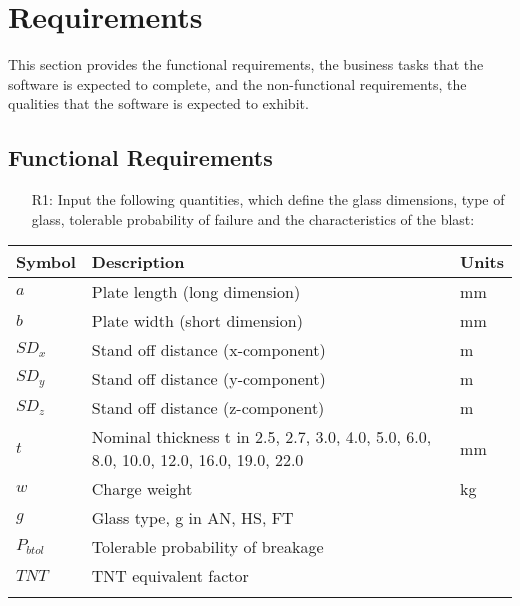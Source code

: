 \documentclass[12pt]{article}
\begin{document}
\section{Requirements}
\label{Sec:Requ}
This section provides the functional requirements, the business tasks that the software is expected to complete, and the non-functional requirements, the qualities that the software is expected to exhibit.
\subsection{Functional Requirements}
\label{Sec:FuncRequ}
\begin{itemize}
\item[R1:]Input the following quantities, which define the glass dimensions, type of glass, tolerable probability of failure and the characteristics of the blast:
\end{itemize}
\begin{longtable*}{l l l}
\toprule
Symbol & Description & Units
\\
\midrule
$a$ & Plate length (long dimension) & mm
\\
$b$ & Plate width (short dimension) & mm
\\
$SD_{x}$ & Stand off distance (x-component) & m
\\
$SD_{y}$ & Stand off distance (y-component) & m
\\
$SD_{z}$ & Stand off distance (z-component) & m
\\
$t$ & Nominal thickness t in {2.5, 2.7, 3.0, 4.0, 5.0, 6.0, 8.0, 10.0, 12.0, 16.0, 19.0, 22.0} & mm
\\
$w$ & Charge weight & kg
\\
$g$ & Glass type, g in {AN, HS, FT} & 
\\
$P_{btol}$ & Tolerable probability of breakage & 
\\
$TNT$ & TNT equivalent factor & 
\\
\bottomrule
\label{Table:RequInpu}
\end{longtable*}
\end{document}
